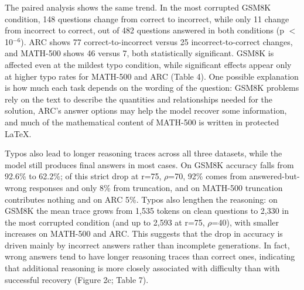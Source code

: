 \documentclass[11pt]{article}
\begin{document}
The paired analysis shows the same trend. In the most corrupted GSM8K condition, 148 questions change from correct to incorrect, while only 11 change from incorrect to correct, out of 482 questions answered in both conditions (p $<$ 10$^{-6}$). ARC shows 77 correct-to-incorrect versus 25 incorrect-to-correct changes, and MATH-500 shows 46 versus 7, both statistically significant. GSM8K is affected even at the mildest typo condition, while significant effects appear only at higher typo rates for MATH-500 and ARC (Table 4). One possible explanation is how much each task depends on the wording of the question: GSM8K problems rely on the text to describe the quantities and relationships needed for the solution, ARC's answer options may help the model recover some information, and much of the mathematical content of MATH-500 is written in protected LaTeX.

Typos also lead to longer reasoning traces across all three datasets, while the model still produces final answers in most cases. On GSM8K accuracy falls from 92.6\% to 62.2\%; of this strict drop at r=75, $\rho$=70, 92\% comes from answered-but-wrong responses and only 8\% from truncation, and on MATH-500 truncation contributes nothing and on ARC 5\%. Typos also lengthen the reasoning: on GSM8K the mean trace grows from 1,535 tokens on clean questions to 2,330 in the most corrupted condition (and up to 2,593 at r=75, $\rho$=40), with smaller increases on MATH-500 and ARC. This suggests that the drop in accuracy is driven mainly by incorrect answers rather than incomplete generations. In fact, wrong answers tend to have longer reasoning traces than correct ones, indicating that additional reasoning is more closely associated with difficulty than with successful recovery (Figure 2c; Table 7).
\end{document}
